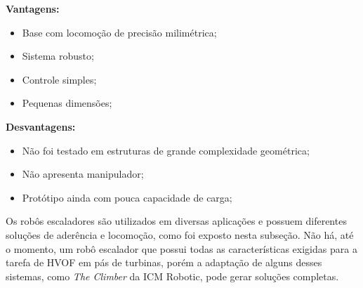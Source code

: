 \textbf{Vantagens:}
\begin{itemize}
  \item Base com locomoção de precisão milimétrica;
  \item Sistema robusto;
  \item Controle simples;
  \item Pequenas dimensões; 
\end{itemize}

\textbf{Desvantagens:}
\begin{itemize}
  \item Não foi testado em estruturas de grande complexidade geométrica; 
  \item Não apresenta manipulador;
  \item Protótipo ainda com pouca capacidade de carga;
\end{itemize}
   
Os robôs escaladores são utilizados em diversas aplicações e possuem diferentes
soluções de aderência e locomoção, como foi exposto nesta subseção. Não há,
até o momento, um robô escalador que possui todas as características
exigidas para a tarefa de HVOF em pás de turbinas, porém a adaptação de
alguns desses sistemas, como \emph{The Climber} da ICM Robotic, pode gerar
soluções completas.
